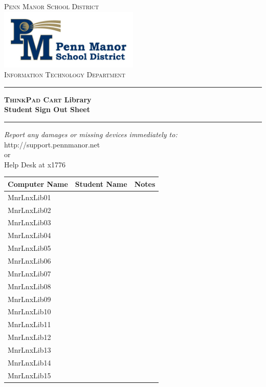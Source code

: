 \begin{titlepage}

\begin{center}

\textsc{\LARGE Penn Manor School District}\\[1.5cm]


\includegraphics[width=0.5\textwidth]{images/logo}\\[1cm]


\textsc{\Large Information Technology Department}\\[0.5cm]


\hrule
{\huge \bfseries \textsc{ThinkPad Cart} Library\\ \vspace{0.5cm} Student Sign Out Sheet}\\[0.4cm]

\hrule


\vfill
\begin{center} \large
\emph{Report any damages or missing devices immediately to:}\\
http://support.pennmanor.net \\or\\Help Desk at x1776
\end{center}


\vfill

\end{center}

\end{titlepage}
\begin{tabular}{|l|p{7cm}|p{5cm}|}
        \hline
        \textbf{Computer Name} & \textbf{Student Name} & \textbf{Notes}\\ \hline
        MnrLnxLib01 & & \\ \hline
        MnrLnxLib02 & & \\ \hline
        MnrLnxLib03 & & \\ \hline
        MnrLnxLib04 & & \\ \hline
        MnrLnxLib05 & & \\ \hline
        MnrLnxLib06 & & \\ \hline
        MnrLnxLib07 & & \\ \hline
        MnrLnxLib08 & & \\ \hline
        MnrLnxLib09 & & \\ \hline
        MnrLnxLib10 & & \\ \hline
        MnrLnxLib11 & & \\ \hline
        MnrLnxLib12 & & \\ \hline
        MnrLnxLib13 & & \\ \hline
        MnrLnxLib14 & & \\ \hline
        MnrLnxLib15 & & \\ \hline
\end{tabular}
